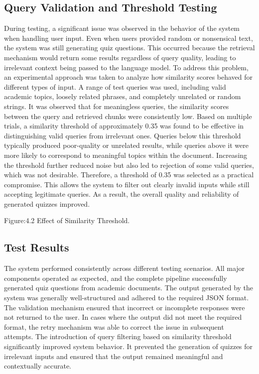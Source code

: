 \documentclass[12pt,a4paper]{report}
\begin{document}
\subsection{Query Validation and Threshold Testing}
During testing, a significant issue was observed in the behavior of the system when handling user input. Even when users provided random or nonsensical text, the system was still generating quiz questions. This occurred because the retrieval mechanism would return some results regardless of query quality, leading to irrelevant context being passed to the language model.
To address this problem, an experimental approach was taken to analyze how similarity scores behaved for different types of input. A range of test queries was used, including valid academic topics, loosely related phrases, and completely unrelated or random strings.
It was observed that for meaningless queries, the similarity scores between the query and retrieved chunks were consistently low. Based on multiple trials, a similarity threshold of approximately 0.35 was found to be effective in distinguishing valid queries from irrelevant ones.
Queries below this threshold typically produced poor-quality or unrelated results, while queries above it were more likely to correspond to meaningful topics within the document. Increasing the threshold further reduced noise but also led to rejection of some valid queries, which was not desirable.
Therefore, a threshold of 0.35 was selected as a practical compromise. This allows the system to filter out clearly invalid inputs while still accepting legitimate queries. As a result, the overall quality and reliability of generated quizzes improved.


Figure:4.2 Effect of Similarity Threshold.
\subsection{Test Results}
The system performed consistently across different testing scenarios. All major components operated as expected, and the complete pipeline successfully generated quiz questions from academic documents.
The output generated by the system was generally well-structured and adhered to the required JSON format. The validation mechanism ensured that incorrect or incomplete responses were not returned to the user. In cases where the output did not meet the required format, the retry mechanism was able to correct the issue in subsequent attempts.
The introduction of query filtering based on similarity threshold significantly improved system behavior. It prevented the generation of quizzes for irrelevant inputs and ensured that the output remained meaningful and contextually accurate.
\end{document}
